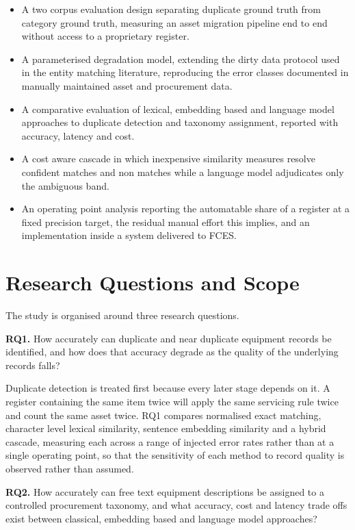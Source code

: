 \documentclass[conference]{IEEEtran}
\begin{document}
\begin{itemize}
\item A two corpus evaluation design separating duplicate ground truth
from category ground truth, measuring an asset migration pipeline end
to end without access to a proprietary register.
\item A parameterised degradation model, extending the dirty data
protocol used in the entity matching literature, reproducing the error
classes documented in manually maintained asset and procurement data.
\item A comparative evaluation of lexical, embedding based and language
model approaches to duplicate detection and taxonomy assignment,
reported with accuracy, latency and cost.
\item A cost aware cascade in which inexpensive similarity measures
resolve confident matches and non matches while a language model
adjudicates only the ambiguous band.
\item An operating point analysis reporting the automatable share of a
register at a fixed precision target, the residual manual effort this
implies, and an implementation inside a system delivered to FCES.
\end{itemize}

\section{Research Questions and Scope}

The study is organised around three research questions.

\textbf{RQ1.} How accurately can duplicate and near duplicate equipment
records be identified, and how does that accuracy degrade as the quality
of the underlying records falls?

Duplicate detection is treated first because every later stage depends
on it. A register containing the same item twice will apply the same
servicing rule twice and count the same asset twice. RQ1 compares
normalised exact matching, character level lexical similarity, sentence
embedding similarity and a hybrid cascade, measuring each across a range
of injected error rates rather than at a single operating point, so that
the sensitivity of each method to record quality is observed rather than
assumed.

\textbf{RQ2.} How accurately can free text equipment descriptions be
assigned to a controlled procurement taxonomy, and what accuracy, cost
and latency trade offs exist between classical, embedding based and
language model approaches?
\end{document}
